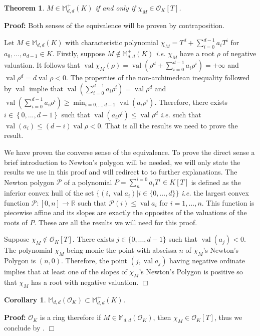 \documentclass[a4paper,12pt]{article}
\newenvironment{proof}{\hbox{}\vspace{-0.8cm} {\bf Proof:}}{\hfill $\Box$}
\newtheorem{theorem}{Theorem}[section]
\newtheorem{corollary}{Corollary}
\newcommand{\R}{\mathbb{R}} %
\newcommand{\allmat}{\mathbb{M}} %
\DeclareMathOperator{\val}{val}
\newcommand{\OK}{\mathcal{O}_K}
\begin{document}
\begin{theorem}
  \label{caracsdp}
  $M \in \allmat_{d,d}^+(K)$ if and only if $\chi_M \in \OK[T]$.
\end{theorem}
\begin{proof}
  Both senses of the equivalence will be proven by contraposition.

  Let $M \in \allmat_{d,d}(K)$ with characteristic polynomial $\chi_M = T^d + \sum_{i=0}^{d-1} a_i T^i$ for $a_0,...,a_{d-1} \in K$.
  Firstly, suppose   $M \not \in \allmat_{d,d}^+(K)$ {\it i.e.} $\chi_M$ have a root $\rho$ of negative valuation.
  It follows that $\val \chi_M (\rho) = \val (\rho^d+ \sum_{i=0}^{d-1} a_i \rho^i ) = + \infty$ and $\val \rho^d = d \val \rho <0$.
  The properties of the non-archimedean inequality followed by $\val $ implie that $\val ( \sum_{i=0}^{d-1} a_i \rho^i) = \val \rho^d$ and $\val ( \sum_{i=0}^{d-1} a_i \rho^i) \ge \min_{i=0,..., d-1} \val \left(a_i \rho^i\right)$. Therefore, there exists $i \in \left\{0,...,d-1\right\}$ such that $\val( a_i \rho^i) \le \val\rho^d$ {\it i.e.} such that $\val (a_i) \le (d-i) \val \rho <0$. That is all the results we need to prove the result.
  
  We have proven the converse sense of the equivalence. To prove the direct sense a brief introduction to Newton's polygon will be needed, we will only state the results we use in this proof and will redirect to \cite{gouvea_p-adic_2003} to further explanations.
  The Newton polygon $\mathcal{P}$ of a polynomial $P = \sum_{n}^{i=0} a_i T^i \in K[T]$ is defined as the inferior convex hull of the set $\{(i, \val a_i ) | i\in \{0,...,d\} \}$ {\it i.e.} the largest convex function $\mathcal{P} : [0,n] \to \R$ such that $\mathcal{P}(i) \leq \val a_i$ for $i=1,...,n$. 
  This function is piecewise affine and its slopes are exactly the opposites of the valuations of the roots of $P$. These are all the results we will need for this proof.

  Suppose $\chi_M \not\in \OK[T]$. There exists $j \in \{0,...,d-1\}$ such that $\val (a_j)<0$. The polynomial $\chi_M$ being monic the point with abscissa $n$ of $\chi_M$'s Newton's Polygon is $(n,0)$. 
  Therefore, the point $(j, \val a_j)$ having negative ordinate implies that at least one of the slopes of $\chi_M$'s Newton's Polygon is positive so that $\chi_M$ has a root with negative valuation.
\end{proof}

\begin{corollary}\label{cor_caracsdp}
  $\allmat_{d,d}(\OK) \subset \allmat_{d,d}^+(K)$.
\end{corollary}
\begin{proof}
  $\OK$ is a ring therefore if $M \in \allmat_{d,d}(\OK)$, then $\chi_M \in \OK[T]$, thus we conclude
  by .
\end{proof}
\end{document}
